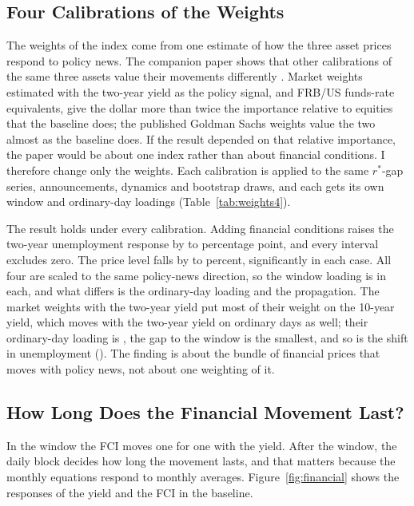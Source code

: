 \documentclass[11pt]{article}
\newcommand{\rs}{r^{*}}
\begin{document}
\subsection{Four Calibrations of the Weights}\label{sec:weights4}
The weights of the index come from one estimate of how the three asset prices respond to policy news. The companion paper shows that other calibrations of the same three assets value their movements differently \citep{fcinote}. Market weights estimated with the two-year yield as the policy signal, and FRB/US funds-rate equivalents, give the dollar more than twice the importance relative to equities that the baseline does; the published Goldman Sachs weights value the two almost as the baseline does. If the result depended on that relative importance, the paper would be about one index rather than about financial conditions. I therefore change only the weights. Each calibration is applied to the same $\rs$-gap series, announcements, dynamics and bootstrap draws, and each gets its own window and ordinary-day loadings (Table~\ref{tab:weights4}).



The result holds under every calibration. Adding financial conditions raises the two-year unemployment response by  to  percentage point, and every interval excludes zero. The price level falls by  to  percent, significantly in each case. All four are scaled to the same policy-news direction, so the window loading is  in each, and what differs is the ordinary-day loading and the propagation. The market weights with the two-year yield put most of their weight on the 10-year yield, which moves with the two-year yield on ordinary days as well; their ordinary-day loading is , the gap to the window is the smallest, and so is the shift in unemployment (). The finding is about the bundle of financial prices that moves with policy news, not about one weighting of it.

\subsection{How Long Does the Financial Movement Last?}\label{sec:resolve}
In the window the FCI moves one for one with the yield. After the window, the daily block decides how long the movement lasts, and that matters because the monthly equations respond to monthly averages. Figure~\ref{fig:financial} shows the responses of the yield and the FCI in the baseline.
\end{document}
